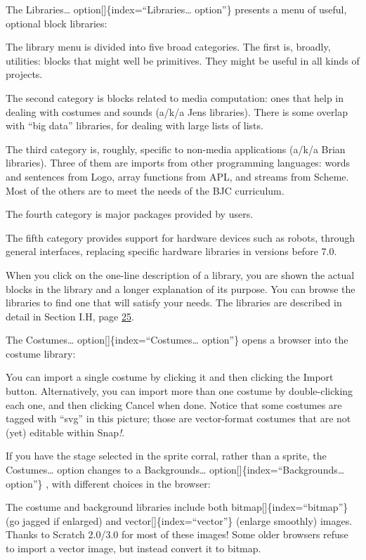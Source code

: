 \documentclass[
  letterpaper,
]{book}
\begin{document}
The Libraries\ldots{} option{[}{]}\{index=``Libraries\ldots{} option''\}
presents a menu of useful, optional block libraries:

The library menu is divided into five broad categories. The first is,
broadly, utilities: blocks that might well be primitives. They might be
useful in all kinds of projects.

The second category is blocks related to media computation: ones that
help in dealing with costumes and sounds (a/k/a Jens libraries). There
is some overlap with ``big data'' libraries, for dealing with large
lists of lists.

The third category is, roughly, specific to non-media applications
(a/k/a Brian libraries). Three of them are imports from other
programming languages: words and sentences from Logo, array functions
from APL, and streams from Scheme. Most of the others are to meet the
needs of the BJC curriculum.

The fourth category is major packages provided by users.

The fifth category provides support for hardware devices such as robots,
through general interfaces, replacing specific hardware libraries in
versions before 7.0.

When you click on the one-line description of a library, you are shown
the actual blocks in the library and a longer explanation of its
purpose. You can browse the libraries to find one that will satisfy your
needs. The libraries are described in detail in Section I.H, page
\hyperref[libraries]{25}.

The Costumes\ldots{} option{[}{]}\{index=``Costumes\ldots{} option''\}
opens a browser into the costume library:

You can import a single costume by clicking it and then clicking the
Import button. Alternatively, you can import more than one costume by
double-clicking each one, and then clicking Cancel when done. Notice
that some costumes are tagged with ``svg'' in this picture; those are
vector-format costumes that are not (yet) editable within Snap\emph{!}.

If you have the stage selected in the sprite corral, rather than a
sprite, the Costumes\ldots{} option changes to a Backgrounds\ldots{}
option{[}{]}\{index=``Backgrounds\ldots{} option''\} , with different
choices in the browser:

The costume and background libraries include both
bitmap{[}{]}\{index=``bitmap''\} (go jagged if enlarged) and
vector{[}{]}\{index=``vector''\} (enlarge smoothly) images. Thanks to
Scratch 2.0/3.0 for most of these images! Some older browsers refuse to
import a vector image, but instead convert it to bitmap.
\end{document}
